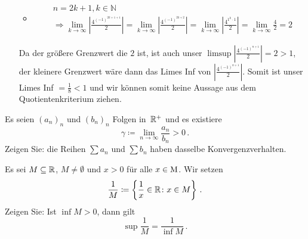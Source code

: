 \begin{lsg}
\begin{enumerate}[label=$\mathrm{(\roman*)}$, ref=$\mathrm{\roman*}$]
\begin{itemize}
\begin{align*}
\end{align*}
\item\begin{align*}
&n = 2k + 1, k \in \mathbb{N} \\
&\Rightarrow \lim_{k \to \infty}\left|\frac{4^{(-1)^{2k+1+1}}}{2}\right| = \lim_{k \to \infty}\left|\frac{4^{(-1)^{2k+2}}}{2}\right| = \lim_{k \to \infty}\left|\frac{4^{1^k\cdot 1}}{2}\right| = \lim_{k \to \infty}\frac{4}{2} = 2
\end{align*}
\end{itemize}
Da der größere Grenzwert die $2$ ist, ist auch unser $\limsup\left|\frac{4^{(-1)^{n+1}}}{2}\right| = 2 > 1$, der kleinere Grenzwert wäre dann das Limes Inf von $\left|\frac{4^{(-1)^{n+1}}}{2}\right|$. Somit ist unser Limes Inf $= \frac{1}{8} < 1$ und wir können somit keine Aussage aus dem Quotientenkriterium ziehen.

\end{enumerate}
\end{lsg}


\bigskip


\begin{aufg}[6 Punkte]
Es seien $(a_n)_n$ und $(b_n)_n$ Folgen in~$\mathbb{R}^+$ und es existiere 
\[
 \gamma\coloneqq \lim_{n\to\infty} \frac{a_n}{b_n} > 0\,.
\]
Zeigen Sie: die Reihen $\sum a_n$ und $\sum b_n$ haben dasselbe Konvergenzverhalten.
\end{aufg}


\bigskip

\begin{lsg}  
\end{lsg}


\bigskip

\begin{aufg}\label{aufg:sonder1}
Es sei $M\subseteq\mathbb{R}$, $M\not=\emptyset$ und $x>0$ f\"ur alle $x\in\operatorname{M}$. Wir setzen
\[
 \frac1M \coloneqq \left\{ \frac1x \in \mathbb{R} \colon x\in M \right\}\,.
\]
Zeigen Sie: Ist $\inf M >0$, dann gilt 
\[
 \sup \frac1M = \frac{1}{\inf M}\,.
\]
\end{aufg}

\bigskip

